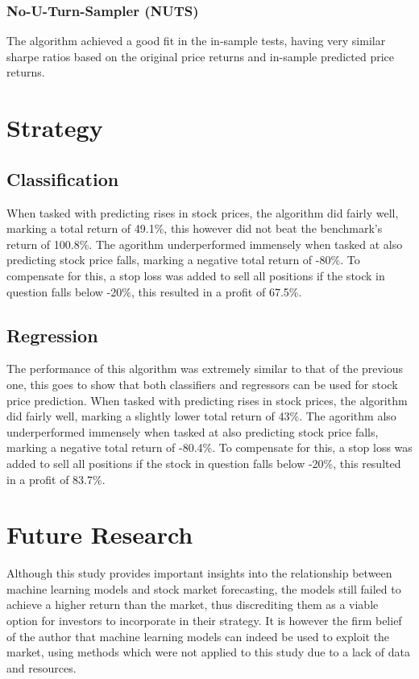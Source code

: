 \subsubsection{No-U-Turn-Sampler (NUTS)}
The algorithm achieved a good fit in the in-sample tests, having very similar sharpe ratios based on the original price returns and in-sample predicted price returns.

\section{Strategy}

\subsection{Classification}
When tasked with predicting rises in stock prices, the algorithm did fairly well, marking a total return of 49.1\%, this however did not beat the benchmark's return of 100.8\%. The agorithm underperformed immensely when tasked at also predicting stock price falls, marking a negative total return of -80\%. To compensate for this, a stop loss was added to sell all positions if the stock in question falls below -20\%, this resulted in a profit of 67.5\%.

\subsection{Regression}
The performance of this algorithm was extremely similar to that of the previous one, this goes to show that both classifiers and regressors can be used for stock price prediction. When tasked with predicting rises in stock prices, the algorithm did fairly well, marking a slightly lower total return of 43\%. The agorithm also underperformed immensely when tasked at also predicting stock price falls, marking a negative total return of -80.4\%. To compensate for this, a stop loss was added to sell all positions if the stock in question falls below -20\%, this resulted in a profit of 83.7\%.

\section{Future Research}
Although this study provides important insights into the relationship between machine learning models and stock market forecasting, the models still failed to achieve a higher return than the market, thus discrediting them as a viable option for investors to incorporate in their strategy. It is however the firm belief of the author that machine learning models can indeed be used to exploit the market, using methods which were not applied to this study due to a lack of data and resources. 

